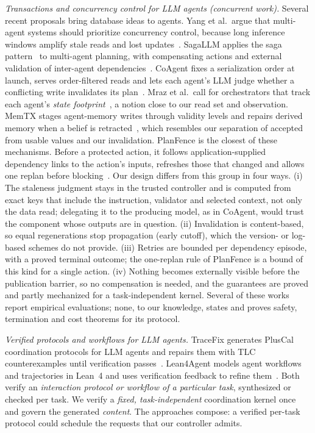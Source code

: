 \emph{Transactions and concurrency control for LLM agents (concurrent work).} Several recent proposals bring database ideas to agents. Yang et al.\ argue that multi-agent systems should prioritize concurrency control, because long inference windows amplify stale reads and lost updates~\cite{yang2026concurrency}. SagaLLM applies the saga pattern~\cite{garcia1987sagas} to multi-agent planning, with compensating actions and external validation of inter-agent dependencies~\cite{chang2025sagallm}. CoAgent fixes a serialization order at launch, serves order-filtered reads and lets each agent's LLM judge whether a conflicting write invalidates its plan~\cite{lyu2026coagent}. Mraz et al.\ call for orchestrators that track each agent's \emph{state footprint}~\cite{mraz2026footprints}, a notion close to our read set and observation. MemTX stages agent-memory writes through validity levels and repairs derived memory when a belief is retracted~\cite{li2026memtx}, which resembles our separation of accepted from usable values and our invalidation. PlanFence is the closest of these mechanisms. Before a protected action, it follows application-supplied dependency links to the action's inputs, refreshes those that changed and allows one replan before blocking~\cite{chen2026planfence}. Our design differs from this group in four ways. (i) The staleness judgment stays in the trusted controller and is computed from exact keys that include the instruction, validator and selected context, not only the data read; delegating it to the producing model, as in CoAgent, would trust the component whose outputs are in question. (ii) Invalidation is content-based, so equal regenerations stop propagation (early cutoff), which the version- or log-based schemes do not provide. (iii) Retries are bounded per dependency episode, with a proved terminal outcome; the one-replan rule of PlanFence is a bound of this kind for a single action. (iv) Nothing becomes externally visible before the publication barrier, so no compensation is needed, and the guarantees are proved and partly mechanized for a task-independent kernel. Several of these works report empirical evaluations; none, to our knowledge, states and proves safety, termination and cost theorems for its protocol.

\emph{Verified protocols and workflows for LLM agents.} TraceFix generates PlusCal coordination protocols for LLM agents and repairs them with TLC counterexamples until verification passes~\cite{xia2026tracefix}. Lean4Agent models agent workflows and trajectories in Lean~4 and uses verification feedback to refine them~\cite{wang2026lean4agent}. Both verify an \emph{interaction protocol or workflow of a particular task}, synthesized or checked per task. We verify a \emph{fixed, task-independent} coordination kernel once and govern the generated \emph{content}. The approaches compose: a verified per-task protocol could schedule the requests that our controller admits.

